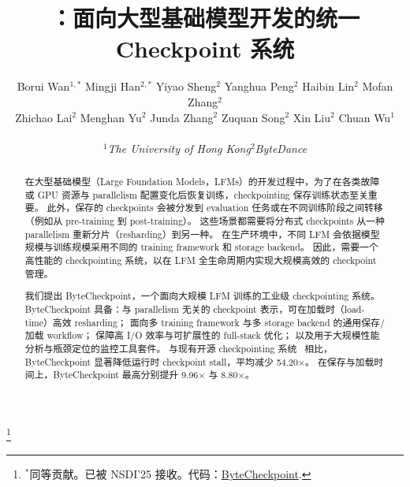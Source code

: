\documentclass[letterpaper,twocolumn,10pt]{article}
\title{\sys{}：面向大型基础模型开发的统一 Checkpoint 系统}
\newcommand{\sys}[0]{ByteCheckpoint}
\begin{document}
\pagestyle{empty}
\author{
    \rm{
        Borui Wan$^{\text{1}, *}$ \enskip
        Mingji Han$^{\text{2}, *}$ \enskip
        Yiyao Sheng$^{\text{2}}$ \enskip
        Yanghua Peng$^{\text{2}}$ \enskip
        Haibin Lin$^{\text{2}}$ \enskip
        Mofan Zhang$^{\text{2}}$ \enskip
    }
    \\
    \rm{
        Zhichao Lai$^{\text{2}}$ \enskip
        Menghan Yu$^{\text{2}}$ \enskip
        Junda Zhang$^{\text{2}}$ \enskip
        Zuquan Song$^{\text{2}}$ \enskip
        Xin Liu$^{\text{2}}$ \enskip
        Chuan Wu$^{\text{1}}$ \enskip
    }
    \\
    \\
    {$^{\text{1}}$\textit{The University of Hong Kong}\enskip $^{\text{2}}$\textit{ByteDance}\enskip}
}


\maketitle
{\let\thefootnote\relax\footnote{{$^*$同等贡献。已被 NSDI'25 接收。代码：\href{https://github.com/ByteDance-Seed/ByteCheckpoint}{ByteCheckpoint}.}}}

\begin{abstract}
在大型基础模型（Large Foundation Models，LFMs）的开发过程中，为了在各类故障或 GPU 资源与 parallelism 配置变化后恢复训练，checkpointing 保存训练状态至关重要。
此外，保存的 checkpoints 会被分发到 evaluation 任务或在不同训练阶段之间转移（例如从 pre-training 到 post-training）。
这些场景都需要将分布式 checkpoints 从一种 parallelism 重新分片（resharding）到另一种。
在生产环境中，不同 LFM 会依据模型规模与训练规模采用不同的 training framework 和 storage backend。
因此，需要一个高性能的 checkpointing 系统，以在 LFM 全生命周期内实现大规模高效的 checkpoint 管理。

我们提出 \sys{}，一个面向大规模 LFM 训练的工业级 checkpointing 系统。
\sys{} 具备：与 parallelism 无关的 checkpoint 表示，可在加载时（load-time）高效 resharding；
面向多 training framework 与多 storage backend 的通用保存/加载 workflow；
保障高 I/O 效率与可扩展性的 full-stack 优化；
以及用于大规模性能分析与瓶颈定位的监控工具套件。
与现有开源 checkpointing 系统~\cite{torch-dcp, megatron-dcp} 相比，\sys{} 显著降低运行时 checkpoint stall，平均减少 54.20$\times$。
在保存与加载时间上，\sys{} 最高分别提升 9.96$\times$ 与 8.80$\times$。
\end{abstract}







% 




\appendix

\end{document}
